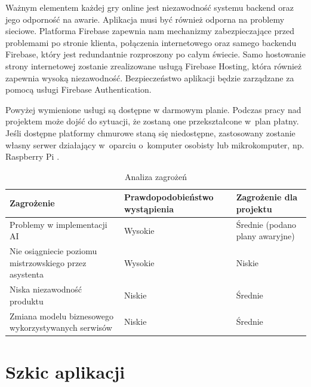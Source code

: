 Ważnym elementem każdej gry online jest niezawodność systemu
backend oraz jego odporność na awarie.
Aplikacja musi być również odporna na problemy sieciowe.
Platforma Firebase zapewnia nam mechanizmy zabezpieczające
przed problemami po stronie klienta, połączenia internetowego
oraz samego backendu Firebase, który jest redundantnie
rozproszony po całym świecie.
Samo hostowanie strony internetowej zostanie zrealizowane
usługą Firebase Hosting, która również zapewnia wysoką
niezawodność.
Bezpieczeństwo aplikacji będzie zarządzane za pomocą
usługi Firebase Authentication.

Powyżej wymienione usługi są dostępne w darmowym planie.
Podczas pracy nad projektem może dojść do sytuacji, że
zostaną one przekształcone w~plan płatny.
Jeśli dostępne platformy chmurowe staną się niedostępne,
zastosowany zostanie własny serwer działający
w~oparciu o~komputer osobisty lub mikrokomputer, np. Raspberry Pi \cite{RPi}.

\begin{table}[h]
  \centering
  \begin{tabularx}{\textwidth}{|p{5.5cm}|Y|Y|}
    \hline
    \textbf{Zagrożenie}                                    & \textbf{Prawdopodobieństwo wystąpienia} & \textbf{Zagrożenie dla projektu} \\
    \hline
    Problemy w implementacji AI                            & Wysokie                                 & Średnie (podano plany awaryjne)  \\
    \addlinespace[0.1cm]
    Nie osiągniecie poziomu mistrzowskiego przez asystenta & Wysokie                                 & Niskie                           \\
    \addlinespace[0.1cm]
    Niska niezawodność produktu                            & Niskie                                  & Średnie                          \\
    \addlinespace[0.1cm]
    Zmiana modelu biznesowego wykorzystywanych serwisów    & Niskie                                  & Średnie                          \\
    \hline
  \end{tabularx}
  \caption{Analiza zagrożeń}
  \label{tab:zagrozenia}
\end{table}


\newpage

\section{Szkic aplikacji}

